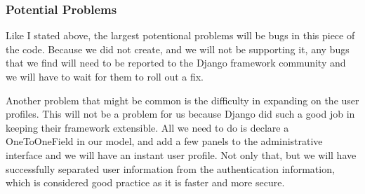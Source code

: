 \subsubsection{Potential Problems}

Like I stated above, the largest potentional problems will be bugs in this piece of the code.
Because we did not create, and we will not be supporting it, any bugs that we find will need to be reported to the Django framework community and we will have to wait for them to roll out a fix.

Another problem that might be common is the difficulty in expanding on the user profiles.
This will not be a problem for us because Django did such a good job in keeping their framework extensible.
All we need to do is declare a OneToOneField in our model, and add a few panels to the administrative interface and we will have an instant user profile.
Not only that, but we will have successfully separated user information from the authentication information, which is considered good practice as it is faster and more secure.